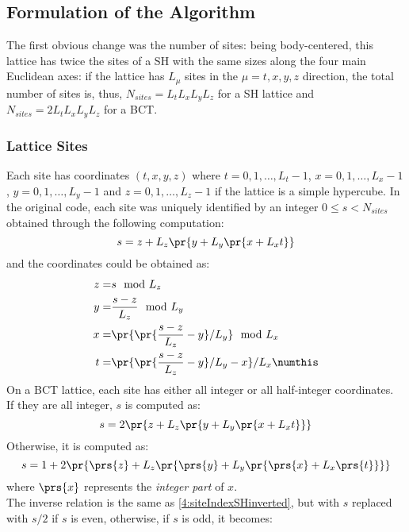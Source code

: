 \subsection{Formulation of the Algorithm}
The first obvious change was the number of sites: being body-centered, this lattice has twice the sites of a SH with the same sizes along the four main Euclidean axes: if the lattice has $L_\mu$ sites in the $\mu=t,x,y,z$ direction, the total number of sites is, thus, $N_{sites}=L_tL_xL_yL_z$ for a SH lattice and $N_{sites}=2L_tL_xL_yL_z$ for a BCT.

\subsubsection{Lattice Sites}
Each site has coordinates $(t,x,y,z)$ where $t = 0, 1, \dots, L_t-1$, $x = 0, 1, \dots, L_x-1$, $y = 0, 1, \dots, L_y-1$ and $z = 0, 1, \dots, L_z-1$ if the lattice is a simple hypercube.
In the original code, each site was uniquely identified by an integer $0 \leq s < N_{sites}$ obtained through the following computation:
\begin{equation}
    s = z + L_z\pr{y + L_y\pr{x + L_xt}} \label{4:siteIndexSH}
\end{equation}
and the coordinates could be obtained as:
\begin{align*}
    z =& s \mod L_z \\
    y =& \frac{s - z}{L_z} \mod L_y \\
    x =& \pr{\pr{\frac{s - z}{L_z} - y}/L_y} \mod L_x \\
    t =& \pr{\pr{\frac{s - z}{L_z} - y}/L_y - x}/L_x \numthis\label{4:siteIndexSHinverted}
\end{align*}
On a BCT lattice, each site has either all integer or all half-integer coordinates.\\
If they are all integer, $s$ is computed as:
\begin{equation}
    s = 2\pr{z + L_z\pr{y + L_y\pr{x + L_xt}}} \label{4:siteIndexBCTeven}
\end{equation}
Otherwise, it is computed as:
\begin{equation}
    s = 1 + 2\pr{\prs{z} + L_z\pr{\prs{y} + L_y\pr{\prs{x} + L_x\prs{t}}}} \label{4:siteIndexBCTodd}
\end{equation}
where $\prs{x}$ represents the \emph{integer part} of $x$.\\
The inverse relation is the same as \eqref{4:siteIndexSHinverted}, but with $s$ replaced with $s/2$ if $s$ is even, otherwise, if $s$ is odd, it becomes:

